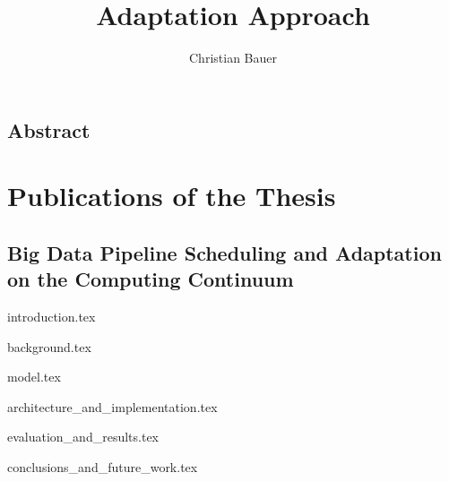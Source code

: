 \documentclass{memoir}
\title{Adaptation Approach}
\author{Christian Bauer}
\begin{document}
  \maketitle

  \tableofcontents
  \listoffigures
  

  \section*{Abstract}

  \chapter*{Publications of the Thesis}

    \section*{Big Data Pipeline Scheduling and Adaptation on the Computing Continuum}
    
    
    

  {introduction.tex}

  {background.tex}

  {model.tex}

  {architecture_and_implementation.tex}
  
  {evaluation_and_results.tex}

  {conclusions_and_future_work.tex}

  \cite{datacloudAbout}

  
  
\end{document}
